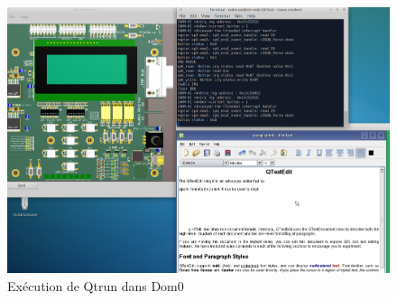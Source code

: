 \begin{figure}[H]
	\begin{center}
		\includegraphics[width=16cm]{img/dom0.png}
		\caption{Exécution de Qtrun dans Dom0}
		\label{qtrun}
	\end{center}
\end{figure}
